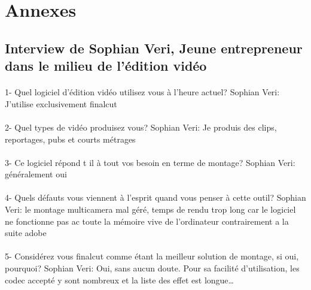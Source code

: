 \newpage
  \section {Annexes}
    \subsection {Interview de Sophian Veri,
    Jeune entrepreneur dans le milieu de l'édition vidéo}

        \paragraph{}
         1-  Quel logiciel d'édition vidéo utilisez vous à l'heure actuel?
            Sophian Veri: J'utilise exclusivement finalcut

        \paragraph{}
         2- Quel types de vidéo produisez vous?
            Sophian Veri: Je produis des clips, reportages, pubs et courts métrages

        \paragraph{}
         3- Ce logiciel répond t il à tout vos besoin en terme de montage?
            Sophian Veri: généralement oui

        \paragraph{}
         4- Quels défauts vous viennent à l'esprit quand vous penser à cette outil?
            Sophian Veri: le montage multicamera mal géré, temps de rendu trop long car le
            logiciel ne fonctionne pas ac toute la mémoire vive de l'ordinateur
            contrairement a la suite adobe

        \paragraph{}
         5- Considérez vous finalcut comme étant la meilleur solution de montage,
            si oui, pourquoi?
            Sophian Veri: Oui, sans aucun doute. Pour sa facilité d'utilisation,
            les codec accepté y sont nombreux et la liste des effet est
            longue\ldots

